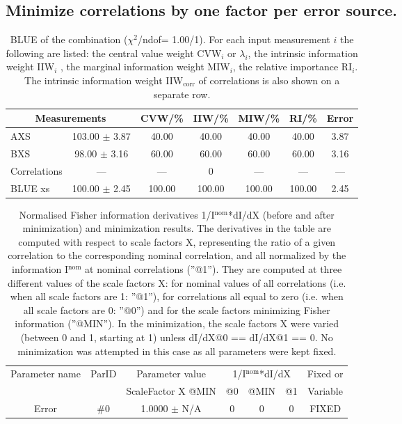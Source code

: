 \subsection{Minimize correlations by one factor per error source.}
\begin{table}[H]
\scriptsize
\begin{center}
\renewcommand{\arraystretch}{1.1}
\begin{tabular}{|lc|c|c|c|c|c|}
\hline
\multicolumn{2}{|c|}{Measurements} & CVW/\%  & IIW/\%  & MIW/\%  & RI/\%  & {\tiny Error}\\
\hline
AXS &     103.00 $\pm$       3.87 &      40.00 &      40.00 &      40.00 &      40.00 &       3.87\\
BXS &      98.00 $\pm$       3.16 &      60.00 &      60.00 &      60.00 &      60.00 &       3.16\\
Correlations & --- & --- &  0 & --- & --- & ---\\
\hline
BLUE {\tiny xs} &     100.00 $\pm$       2.45 &     100.00 &     100.00 &     100.00 &     100.00 &       2.45\\
\hline
\end{tabular}
\caption{BLUE of the combination ($\chi^2$/ndof=      1.00/1).
 For each input measurement $i$ the following are listed: the central value weight CVW$_i$ or $\lambda_i$, the intrinsic information weight IIW$_i$ , the marginal information weight MIW$_i$, the relative importance RI$_i$. The intrinsic information weight IIW$_{\mathrm{corr}}$ of correlations is also shown on a separate row.}
\renewcommand{\arraystretch}{1}
\end{center}
\end{table}
\begin{table}[H]
\scriptsize
\begin{center}
\renewcommand{\arraystretch}{1.1}
\begin{tabular}{|c|c|c|ccc|c|}
\hline
Parameter name & ParID & Parameter value &\multicolumn{3}{|c|}{1/I$^\mathrm{nom}$*dI/dX} & Fixed or\\
 & & ScaleFactor X @MIN & @0 & @MIN & @1 & Variable\\
\hline
 {\tiny Error} & \#0 &    1.0000 $\pm$ N/A & 0 & 0 & 0 & FIXED \\
\hline
\end{tabular}
\renewcommand{\arraystretch}{1}
\caption{Normalised Fisher information derivatives 1/I$^\mathrm{nom}$*dI/dX (before and after minimization) and minimization results.  The derivatives in the table are computed with respect to scale factors X, representing the ratio of a given correlation to the corresponding nominal correlation, and all normalized by the information I$^\mathrm{nom}$ at nominal correlations (''@1''). They are computed at three different values of the scale factors X: for nominal values of all correlations (i.e. when all scale factors are 1: ''@1''), for correlations all equal to zero (i.e. when all scale factors are 0: ''@0'') and for the scale factors minimizing Fisher information (''@MIN''). In the minimization, the scale factors X were varied (between 0 and 1, starting at 1) unless dI/dX@0 == dI/dX@1 == 0. No minimization was attempted in this case as all parameters were kept fixed.}
\end{center}
\end{table}
